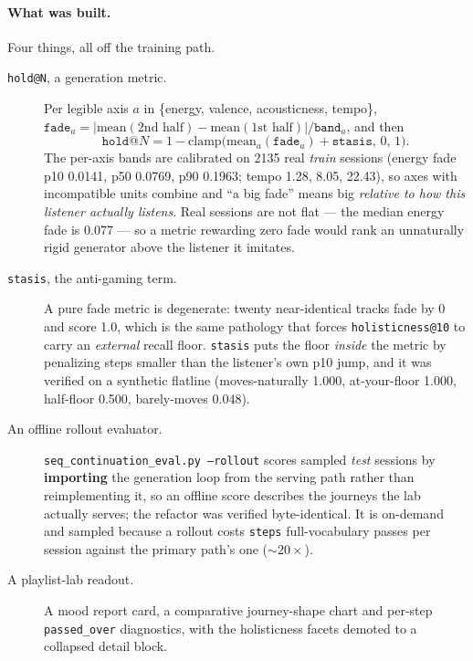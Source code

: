 \documentclass[11pt]{article}
\begin{document}
\paragraph{What was built.} Four things, all off the training path.
\begin{description}
  \item[\texttt{hold@N}, a generation metric.] Per legible axis $a$ in
  \{energy, valence, acousticness, tempo\},
  $\texttt{fade}_a = |\mathrm{mean}(\text{2nd half}) -
  \mathrm{mean}(\text{1st half})|/\texttt{band}_a$, and then
  \[
    \texttt{hold@}N = 1 - \mathrm{clamp}\bigl(\mathrm{mean}_a(\texttt{fade}_a)
      + \texttt{stasis},\,0,\,1\bigr).
  \]
  The per-axis bands are calibrated on \num{2135} real
  \emph{train} sessions (energy fade p10 \num{0.0141}, p50 \num{0.0769}, p90
  \num{0.1963}; tempo \num{1.28}, \num{8.05}, \num{22.43}), so axes with
  incompatible units combine and ``a big fade'' means big \emph{relative to how
  this listener actually listens}. Real sessions are not flat --- the median energy
  fade is \num{0.077} --- so a metric rewarding zero fade would rank an
  unnaturally rigid generator above the listener it imitates.
  \item[\texttt{stasis}, the anti-gaming term.] A pure fade metric is
  degenerate: twenty near-identical tracks fade by \num{0} and score \num{1.0},
  which is the
  same pathology that forces \texttt{holisticness@10} to carry an \emph{external}
  recall floor. \texttt{stasis} puts the floor \emph{inside} the metric by
  penalizing steps smaller than the listener's own p10 jump, and it was verified
  on a synthetic flatline (moves-naturally \num{1.000}, at-your-floor \num{1.000},
  half-floor \num{0.500}, barely-moves \num{0.048}).
  \item[An offline rollout evaluator.] \texttt{seq\_continuation\_eval.py
  --rollout} scores sampled \emph{test} sessions by \textbf{importing} the
  generation loop from the serving path rather than reimplementing it, so an
  offline score describes the journeys the lab actually serves; the refactor was
  verified byte-identical. It is on-demand and sampled because a rollout costs
  \texttt{steps} full-vocabulary passes per session against the primary path's one
  (${\sim}20\times$).
  \item[A playlist-lab readout.] A mood report card, a comparative journey-shape
  chart and per-step \texttt{passed\_over} diagnostics, with the holisticness
  facets demoted to a collapsed detail block.
\end{description}
\end{document}
